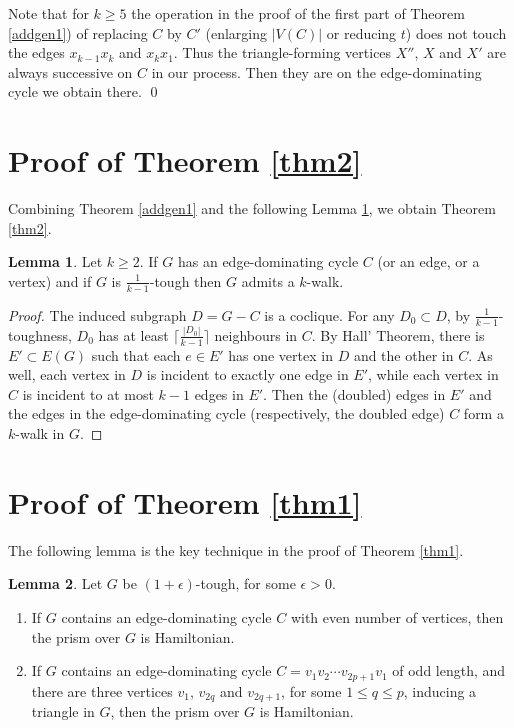 \documentclass{amsart}
\theoremstyle{definition}
\newtheorem{conjecture}{Conjecture}
\newtheorem{lemma}{Lemma}
\begin{document}
Note that for $k\geq 5$ the operation 
in the proof of the first part of Theorem \ref{addgen1}) 
of replacing  $C$ by $C'$ (enlarging $|V(C)|$ or reducing $t$) 
does not touch the edges $x_{k-1}x_k$ and $x_kx_1$. Thus the triangle-forming 
vertices $X''$, $X$ and $X'$ are always successive on $C$ in our process. 
Then they are on the edge-dominating cycle we obtain there.  \qed


\section{Proof of Theorem \ref{thm2}}


Combining Theorem \ref{addgen1} and the following
Lemma \ref{addtec}, we obtain Theorem \ref{thm2}.

\begin{lemma}\label{addtec}
Let $k\geq 2$.
If $G$ has an edge-dominating cycle $C$ (or an edge, or a vertex) 
and if $G$ is $\frac{1}{k-1}$-tough then $G$ admits a $k$-walk.
\end{lemma}
\begin{proof} 
The induced subgraph $D=G-C$ is a coclique. For any
$D_0\subset D$, by $\frac{1}{k-1}$-toughness, $D_0$ has at least
$\lceil\frac{|D_0|}{k-1}\rceil$ neighbours in $C$. By Hall' Theorem, there is
$E'\subset E(G)$ such that each $e\in E'$ has one vertex in $D$ and the other
in $C$. As well, each vertex in $D$ is incident to exactly one edge in $E'$, while
each vertex in $C$ is incident to at most $k-1$ edges in $E'$. Then the
(doubled) edges in $E'$ and the edges in the edge-dominating cycle 
(respectively, the doubled edge) $C$ form a $k$-walk in $G$.  
\end{proof}

%


\section{Proof of Theorem \ref{thm1}}
The following lemma is the key technique in the proof of Theorem \ref{thm1}.
\begin{lemma}\label{keylem}
Let $G$ be $(1+\epsilon)$-tough, for some $\epsilon>0$.
\begin{enumerate}
\item If $G$ contains an edge-dominating cycle $C$ with even number of vertices, then the prism over $G$ is Hamiltonian.
\item If $G$ contains an edge-dominating cycle $C=v_1v_2\cdots v_{2p+1}v_1$ of odd length, and there are three vertices $v_1$, $v_{2q}$ and $v_{2q+1}$, for some $1\le q\le p$, inducing a triangle in $G$, then the prism over $G$ is Hamiltonian.
\end{enumerate}
\end{lemma}
\end{document}
